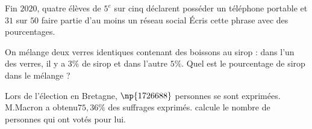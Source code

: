 \documentclass[a4paper,10pt]{report}
\begin{document}
\begin{ex}
\og Fin $2020$, quatre élèves de $5^e$ sur cinq déclarent posséder un téléphone portable et $31$ sur $50$ faire partie d'au moins un réseau social \fg{} Écris cette phrase avec des pourcentages.
\end{ex}

\begin{ex}
On mélange deux verres identiques contenant des boissons au sirop : dans l'un des verres, il y a $3\%$ de sirop et dans l'autre $5\%$. Quel est le pourcentage de sirop dans le mélange ?
\end{ex}

\begin{ex}
Lors de l'élection en Bretagne, $\np{1726688}$ personnes se sont exprimées. M.Macron a obtenu$75,36\%$ des suffrages exprimés. calcule le nombre de personnes qui ont votés pour lui.
\end{ex}
\end{document}
